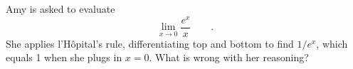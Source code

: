 Amy is asked to evaluate
\begin{equation*}
  \lim_{x\rightarrow 0} \frac{e^x}{x} \qquad .
\end{equation*}
She applies l'H\^{o}pital's rule, differentiating top and bottom to find
$1/e^x$, which equals 1 when she plugs in $x=0$. What is wrong with her reasoning?
